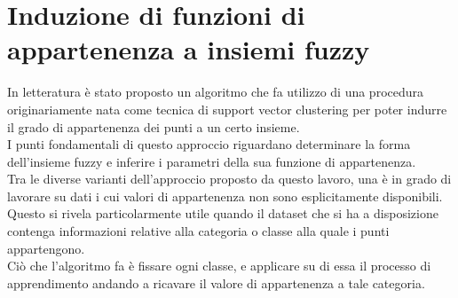 \documentclass[12pt]{report}
\theoremstyle{definition}
\begin{document}
\section{Induzione di funzioni di appartenenza a insiemi fuzzy} \label{induzione}
In letteratura è stato proposto un algoritmo \cite{1} che fa utilizzo di una procedura originariamente nata come tecnica di support vector clustering \cite{23} per poter indurre il grado di appartenenza dei punti a un certo insieme.
\\
I punti fondamentali di questo approccio riguardano determinare la forma dell'insieme fuzzy e inferire i parametri della sua funzione di appartenenza.
\\
Tra le diverse varianti dell'approccio proposto da questo lavoro, una è in grado di lavorare su dati i cui valori di appartenenza non sono esplicitamente disponibili.
\\
Questo si rivela particolarmente utile quando il dataset che si ha a disposizione contenga informazioni relative alla categoria o classe alla quale i punti appartengono.
\\
Ciò che l'algoritmo fa è fissare ogni classe, e applicare su di essa il processo di apprendimento andando a ricavare il valore di appartenenza a tale categoria.
\end{document}
